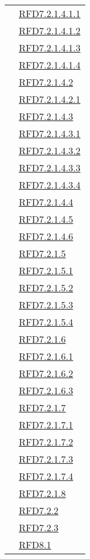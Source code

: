 \begin{longtable}{|>{\centering}m{5cm}|m{5cm}<{\centering}|}
& \hyperlink{RFD7.2.1.4.1.1}{RFD7.2.1.4.1.1}\\
& \hyperlink{RFD7.2.1.4.1.2}{RFD7.2.1.4.1.2}\\
& \hyperlink{RFD7.2.1.4.1.3}{RFD7.2.1.4.1.3}\\
& \hyperlink{RFD7.2.1.4.1.4}{RFD7.2.1.4.1.4}\\
& \hyperlink{RFD7.2.1.4.2}{RFD7.2.1.4.2}\\
& \hyperlink{RFD7.2.1.4.2.1}{RFD7.2.1.4.2.1}\\
& \hyperlink{RFD7.2.1.4.3}{RFD7.2.1.4.3}\\
& \hyperlink{RFD7.2.1.4.3.1}{RFD7.2.1.4.3.1}\\
& \hyperlink{RFD7.2.1.4.3.2}{RFD7.2.1.4.3.2}\\
& \hyperlink{RFD7.2.1.4.3.3}{RFD7.2.1.4.3.3}\\
& \hyperlink{RFD7.2.1.4.3.4}{RFD7.2.1.4.3.4}\\
& \hyperlink{RFD7.2.1.4.4}{RFD7.2.1.4.4}\\
& \hyperlink{RFD7.2.1.4.5}{RFD7.2.1.4.5}\\
& \hyperlink{RFD7.2.1.4.6}{RFD7.2.1.4.6}\\
& \hyperlink{RFD7.2.1.5}{RFD7.2.1.5}\\
& \hyperlink{RFD7.2.1.5.1}{RFD7.2.1.5.1}\\
& \hyperlink{RFD7.2.1.5.2}{RFD7.2.1.5.2}\\
& \hyperlink{RFD7.2.1.5.3}{RFD7.2.1.5.3}\\
& \hyperlink{RFD7.2.1.5.4}{RFD7.2.1.5.4}\\
& \hyperlink{RFD7.2.1.6}{RFD7.2.1.6}\\
& \hyperlink{RFD7.2.1.6.1}{RFD7.2.1.6.1}\\
& \hyperlink{RFD7.2.1.6.2}{RFD7.2.1.6.2}\\
& \hyperlink{RFD7.2.1.6.3}{RFD7.2.1.6.3}\\
& \hyperlink{RFD7.2.1.7}{RFD7.2.1.7}\\
& \hyperlink{RFD7.2.1.7.1}{RFD7.2.1.7.1}\\
& \hyperlink{RFD7.2.1.7.2}{RFD7.2.1.7.2}\\
& \hyperlink{RFD7.2.1.7.3}{RFD7.2.1.7.3}\\
& \hyperlink{RFD7.2.1.7.4}{RFD7.2.1.7.4}\\
& \hyperlink{RFD7.2.1.8}{RFD7.2.1.8}\\
& \hyperlink{RFD7.2.2}{RFD7.2.2}\\
& \hyperlink{RFD7.2.3}{RFD7.2.3}\\
& \hyperlink{RFD8.1}{RFD8.1}\\

\end{longtable}
